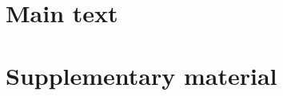 \documentclass[11pt]{article}
\begin{document}
\section*{Main text}


\clearpage
\section*{Supplementary material}


\end{document}
